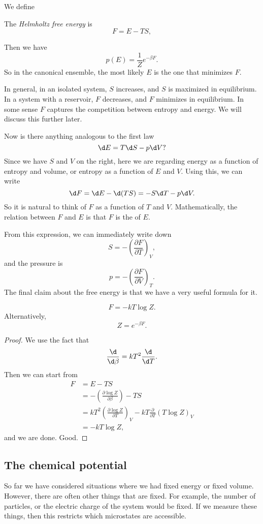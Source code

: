 \documentclass[a4paper]{article}
\begin{document}
We define
\begin{defi}
  The \emph{Helmholtz free energy} is
  \[
    F = E - TS,
  \]
\end{defi}
Then we have
\[
  p(E) = \frac{1}{Z} e^{-\beta F}.
\]
So in the canonical ensemble, the most likely $E$ is the one that minimizes $F$.

In general, in an isolated system, $S$ increases, and $S$ is maximized in equilibrium. In a system with a reservoir, $F$ decreases, and $F$ minimizes in equilibrium. In some sense $F$ captures the competition between entropy and energy. We will discuss this further later.

Now is there anything analogous to the first law
\[
  \d E = T \d S - p \d V?
\]
Since we have $S$ and $V$ on the right, here we are regarding energy as a function of entropy and volume, or entropy as a function of $E$ and $V$. Using this, we can write
\[
  \d F = \d E - \d(TS) = -S \d T - p \d V.
\]
So it is natural to think of $F$ as a function of $T$ and $V$. Mathematically, the relation between $F$ and $E$ is that $F$ is the  of $E$.

From this expression, we can immediately write down
\[
  S = - \left(\frac{\partial F}{\partial T}\right)_V,
\]
and the pressure is
\[
  p = -\left(\frac{\partial F}{\partial V}\right)_T.
\]
The final claim about the free energy is that we have a very useful formula for it.
\begin{prop}
  \[
    F = -kT \log Z.
  \]
  Alternatively,
  \[
    Z = e^{-\beta F}.
  \]
\end{prop}

\begin{proof}
  We use the fact that
  \[
    \frac{\d}{\d \beta} = kT^2 \frac{\d}{\d T}.
  \]
  Then we can start from
  \begin{align*}
    F &= E - TS \\
    &= - \left(\frac{\partial \log Z}{\partial \beta}\right) - TS \\
    &= kT^2 \left(\frac{\partial \log Z}{\partial T}\right)_V - kT \frac{\partial}{\partial T}(T \log Z)_V\\
    &= -k T \log Z,
  \end{align*}
  and we are done. Good.
\end{proof}

\subsection{The chemical potential}
So far we have considered situations where we had fixed energy or fixed volume. However, there are often other things that are fixed. For example, the number of particles, or the electric charge of the system would be fixed. If we measure these things, then this restricts which microstates are accessible.
\end{document}
